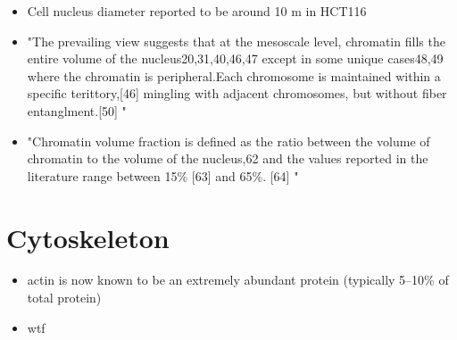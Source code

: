 \documentclass[11pt,a4paper]{article}
\begin{document}
\begin{itemize}
\item Cell nucleus diameter reported to be around 10 \textmu m  in HCT116 \cite{Kang2010}
\item "The prevailing view suggests that at the mesoscale level, chromatin fills the entire volume of the nucleus20,31,40,46,47 except in some unique cases48,49 where the chromatin is peripheral.Each chromosome is maintained within a specific terittory,[46] mingling with adjacent chromosomes, but without fiber entanglment.[50] "\cite{Lorber2022}
\item "Chromatin volume fraction is defined as the ratio between the volume of chromatin to the volume of the nucleus,62 and the values reported in the literature range between 15\% [63] and 65\%. [64] "\cite{Lorber2022}
\end{itemize}

\section{Cytoskeleton}
\begin{itemize}
\item actin is now known to be an extremely abundant protein (typically 5–10\% of total protein) \cite{Cooper2006}
\item wtf
\end{itemize}
\end{document}
